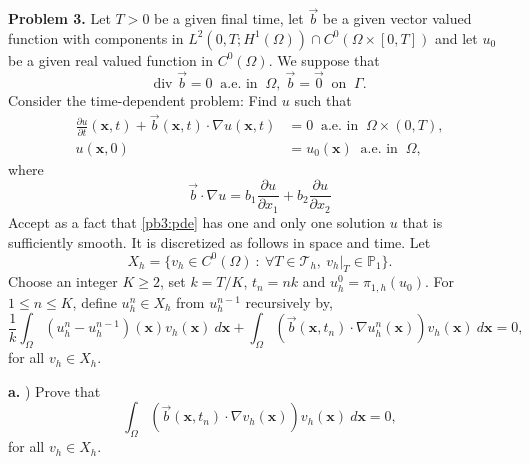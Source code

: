 \documentclass[11pt]{article}
\newcommand{\bs}{\boldsymbol}
\begin{document}
\textbf{Problem 3.} Let $T > 0$ be a given final time, let $\Vec{b}$ be a given vector valued function with components in $L^2(0,T; H^1(\Omega))\cap C^0(\Omega \times [0, T])$ and let $u_0$ be a given real valued function in $C^0(\Omega)$. 
We suppose that 
\begin{equation}
    \text{div }\Vec{b} = 0 \: \text{ a.e. in } \: \Omega, \: \Vec{b} = \Vec{0} \:  \text{ on } \: \Gamma.   
\end{equation}
Consider the time-dependent problem: Find $u$ such that 
\begin{equation} \label{pb3:pde}
\begin{split}
	\frac{\partial u}{\partial t}(\bs{x},t) + \Vec{b}(\bs{x},t) \cdot \nabla u(\bs{x}, t) &= 0 \: \text{ a.e. in } \: \Omega \times (0,T), \\
    u(\bs{x},0) &= u_0(\bs{x}) \: \text{ a.e. in } \: \Omega,
\end{split}
\end{equation}
where
\begin{equation}
    \Vec{b}\cdot \nabla u = b_1 \frac{\partial u}{\partial x_1} + b_2 \frac{\partial u}{\partial x_2} 
\end{equation}
Accept as a fact that \eqref{pb3:pde} has one and only one solution $u$ that is sufficiently smooth.  
It is discretized as follows in space and time. 
Let 
\begin{equation}
    X_h = \{ v_h \in C^0(\Omega) \: : \: \forall T \in \mathcal{T}_h, \: v_h|_T \in \mathbb{P}_1 \}.
\end{equation}
Choose an integer $K \geq 2$, set $k=T/K$, $t_n = nk$ and $u^0_h = \pi_{1,h}(u_0)$.
For $1 \leq n \leq K$, define $u^n_h \in X_h$ from $u^{n-1}_h$ recursively by,
\begin{equation} \label{pb3:var_form}
    \frac{1}{k} \int_\Omega (u^n_h - u^{n-1}_h)(\bs{x}) v_h(\bs{x}) \: d\bs{x} + \int_\Omega (\Vec{b}(\bs{x}, t_n) \cdot \nabla u^n_h(\bs{x})) v_h(\bs{x}) \: d\bs{x} = 0,
\end{equation}
for all $v_h \in X_h$.

\vskip 1cm


\textbf{a.} ) Prove that
\begin{equation}
    \int_\Omega (\Vec{b}(\bs{x}, t_n) \cdot \nabla v_h(\bs{x})) v_h(\bs{x}) \: d\bs{x} = 0,
\end{equation}
for all $v_h \in X_h$.

\vskip 1cm
\end{document}
